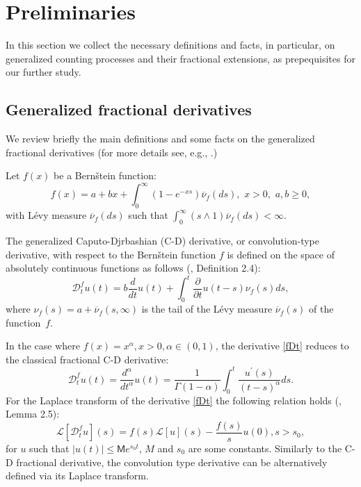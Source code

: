 \documentclass[12pt]{article}
\theoremstyle{definition}
\theoremstyle{plain}
\begin{document}
\section{Preliminaries}

In this section we collect the necessary definitions and facts, in particular, on generalized counting processes and their fractional extensions, as prepequisites for our further study.


\subsection{Generalized fractional derivatives} 
We review briefly the main definitions and some  facts on the generalized fractional derivatives (for more details see, e.g., \cite{MT, T}.) 

Let $f(x)$ be a Bern\v{s}tein function:
\begin{equation}\label{fx}
f(x)=a+bx+\int_{0}^{\infty}\left(1-e^{-xs}\right)\overline{\nu}_f(ds), \,\,x>0, \,\,a, b\geq0, 
\end{equation}
with L\'evy measure $\overline{\nu}_f(ds)$ such that
$
\int_{0}^{\infty}\left(s\wedge 1\right)\overline{\nu}_f(ds)<\infty.$

The generalized Caputo-Djrbashian (C-D) derivative, or convolution-type deri\-va\-tive, with respect to the Bern\v{s}tein function $f$ is defined on the space of absolutely continuous functions as follows (\cite{T}, Definition 2.4):
\begin{equation}\label{fDt}
\mathcal{D}^f_t u(t)=b \frac{d}{dt}u(t)+\int_{0}^{t}\frac{\partial }{\partial t }u(t-s)\nu_f (s)ds,
\end{equation}
where $\nu_f (s)=a+\overline{\nu}_f(s,\infty)$ is the tail of the L\'evy measure $\overline{\nu}_f(s)$ of the function~$f$.


In the case where $f(x)=x^{\alpha},x>0, \alpha\in (0,1)$, the derivative \eqref{fDt} reduces to the classical fractional C-D
derivative:
\begin{equation}\label{C-D}
\mathcal{D}^f_t u(t)=\frac{d^{\alpha}}{dt^{\alpha}}u(t)=\frac{1}{\Gamma(1-\alpha)}\int_{0}^{t}\frac{u^\prime(s)}{\left(t-s\right)^{\alpha}}ds.
\end{equation}
For the Laplace transform of the derivative \eqref{fDt} the following relation holds (\cite{T}, Lemma 2.5):
\begin{equation*}\label{LfDt}
\mathcal{L}\left[\mathcal{D}^f_t u\right](s)=f(s)\mathcal{L}\left[u\right](s)-\frac{f(s)}{s}u(0), s>s_0,
\end{equation*}
for $u$ such that $|u(t)|\leq\mathsf{M} e^{s_0t}$, $M$ and $s_0$ are some constants. Similarly to the C-D fractional derivative, the convolution type derivative can be  alternatively defined via its Laplace transform.
\end{document}
